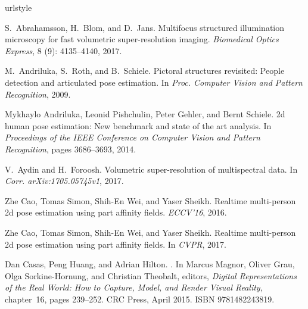 \documentclass{bmvc2k}
\begin{document}
      \begin{thebibliography}{47}
\providecommand{\natexlab}[1]{#1}
\providecommand{\url}[1]{\texttt{#1}}
\expandafter\ifx\csname urlstyle\endcsname\relax
  \providecommand{\doi}[1]{doi: #1}\else
  \providecommand{\doi}{doi: \begingroup \urlstyle{rm}\Url}\fi

S.~Abrahamsson, H.~Blom, and D.~Jans.
\newblock Multifocus structured illumination microscopy for fast volumetric
  super-resolution imaging.
\newblock \emph{Biomedical Optics Express}, 8 (9):
  4135--4140, 2017.

M.~Andriluka, S.~Roth, and B.~Schiele.
\newblock Pictoral structures revisited: People detection and articulated pose
  estimation.
\newblock In \emph{Proc. Computer Vision and Pattern Recognition}, 2009.

Mykhaylo Andriluka, Leonid Pishchulin, Peter Gehler, and Bernt Schiele.
\newblock 2d human pose estimation: New benchmark and state of the art
  analysis.
\newblock In \emph{Proceedings of the IEEE Conference on Computer Vision and
  Pattern Recognition}, pages 3686--3693, 2014.

V.~Aydin and H.~Foroosh.
\newblock Volumetric super-resolution of multispectral data.
\newblock In \emph{Corr. arXiv:1705.05745v1}, 2017.

Zhe Cao, Tomas Simon, Shih-En Wei, and Yaser Sheikh.
\newblock Realtime multi-person 2d pose estimation using part affinity fields.
\newblock \emph{ECCV'16}, 2016.

Zhe Cao, Tomas Simon, Shih-En Wei, and Yaser Sheikh.
\newblock Realtime multi-person 2d pose estimation using part affinity fields.
\newblock In \emph{CVPR}, 2017.

Dan Casas, Peng Huang, and Adrian Hilton.
.
\newblock In Marcus Magnor, Oliver Grau, Olga Sorkine-Hornung, and Christian
  Theobalt, editors, \emph{Digital Representations of the Real World: How to
  Capture, Model, and Render Visual Reality}, chapter~16, pages 239--252. {CRC}
  Press, April 2015.
\newblock ISBN 9781482243819.


\end{thebibliography}
\end{document}
